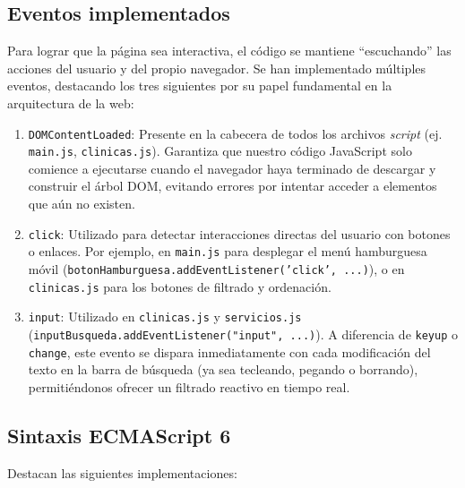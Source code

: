\documentclass[11pt]{article}
\begin{document}
\subsection{Eventos implementados}

Para lograr que la página sea interactiva, el código se mantiene ``escuchando'' las acciones del usuario y del propio navegador. Se han implementado múltiples eventos, destacando los tres siguientes por su papel fundamental en la arquitectura de la web:

\begin{enumerate}
    \item \texttt{DOMContentLoaded}: Presente en la cabecera de todos los archivos \textit{script} (ej. \texttt{main.js}, \texttt{clinicas.js}). Garantiza que nuestro código JavaScript solo comience a ejecutarse cuando el navegador haya terminado de descargar y construir el árbol DOM, evitando errores por intentar acceder a elementos que aún no existen.
    \item \texttt{click}: Utilizado para detectar interacciones directas del usuario con botones o enlaces. Por ejemplo, en \texttt{main.js} para desplegar el menú hamburguesa móvil (\texttt{botonHamburguesa.addEventListener('click', ...)}), o en \texttt{clinicas.js} para los botones de filtrado y ordenación.
    \item \texttt{input}: Utilizado en \texttt{clinicas.js} y \texttt{servicios.js} (\texttt{inputBusqueda.addEventListener("input", ...)}). A diferencia de \texttt{keyup} o \texttt{change}, este evento se dispara inmediatamente con cada modificación del texto en la barra de búsqueda (ya sea tecleando, pegando o borrando), permitiéndonos ofrecer un filtrado reactivo en tiempo real.
\end{enumerate}

\subsection{Sintaxis ECMAScript 6}

Destacan las siguientes implementaciones:
\end{document}
